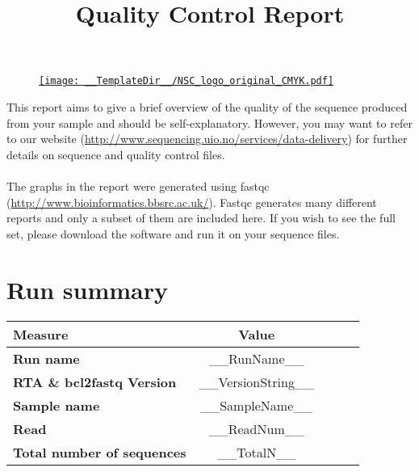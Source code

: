 \documentclass[a4paper, 12pt]{article}
\begin{document}
\begin{figure}
\centering
\href{http://www.sequencing.uio.no/}{\texttt{[image: \_\_TemplateDir\_\_/NSC\_logo\_original\_CMYK.pdf]}}
\end{figure}

\title{\bf \Huge Quality Control Report}
\maketitle
This report aims to give a brief overview of the quality of the sequence produced from your sample and should be self-explanatory. However, you may want to refer to our website (\href{http://www.sequencing.uio.no/services/data-delivery}{http://www.sequencing.uio.no/services/data-delivery}) for further details on sequence and quality control files.
\\
\\
The graphs in the report were generated using fastqc (\href{http://www.bioinformatics.bbsrc.ac.uk/projects/fastqc/} {http://www.bioinformatics.bbsrc.ac.uk/}). Fastqc generates many different reports and only a subset of them are included here. If you wish to see the full set, please download the software and run it on your sequence files.

\section{Run summary}
\begin{center}
\begin{table}[H]
\centering
\begin{tabular}{lclcl}
\toprule
{\bf Measure} &{\bf Value}\\
\midrule
{\bf Run name} & __RunName__\\
{\bf RTA \& bcl2fastq Version} & __VersionString__\\
{\bf Sample name} & __SampleName__ \\
{\bf Read} & __ReadNum__ \\
{\bf Total number of sequences} & __TotalN__\\
\bottomrule
\end{tabular}
\end{table}
\end{center}
\end{document}
